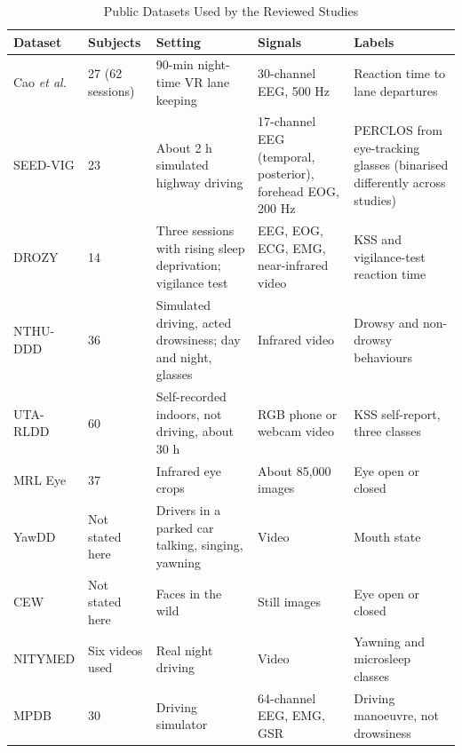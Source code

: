 \begin{table}[!t]
\centering
\caption{Public Datasets Used by the Reviewed Studies}
\label{tab:datasets}
\scriptsize
\setlength{\tabcolsep}{3pt}
\begin{tabularx}{\textwidth}{@{}L{2.5cm}L{1.6cm}L{4cm}L{3.1cm}Y@{}}
\toprule
\textbf{Dataset} & \textbf{Subjects} & \textbf{Setting} & \textbf{Signals} & \textbf{Labels} \\
\midrule
Cao \textit{et al.} \cite{cao2019multichannel} & 27 (62 sessions) & 90-min night-time VR lane keeping & 30-channel EEG, 500 Hz & Reaction time to lane departures \\
SEED-VIG \cite{zheng2017multimodal} & 23 & About 2 h simulated highway driving & 17-channel EEG (temporal, posterior), forehead EOG, 200 Hz & PERCLOS from eye-tracking glasses (binarised differently across studies) \\
DROZY \cite{massoz2016drozy} & 14 & Three sessions with rising sleep deprivation; vigilance test & EEG, EOG, ECG, EMG, near-infrared video & KSS and vigilance-test reaction time \\
NTHU-DDD \cite{weng2017nthu} & 36 & Simulated driving, acted drowsiness; day and night, glasses & Infrared video & Drowsy and non-drowsy behaviours \\
UTA-RLDD \cite{ghoddoosian2019realistic} & 60 & Self-recorded indoors, not driving, about 30 h & RGB phone or webcam video & KSS self-report, three classes \\
MRL Eye \cite{fusek2018mrl} & 37 & Infrared eye crops & About 85{,}000 images & Eye open or closed \\
YawDD \cite{abtahi2014yawdd} & Not stated here & Drivers in a parked car talking, singing, yawning & Video & Mouth state \\
CEW \cite{song2014cew} & Not stated here & Faces in the wild & Still images & Eye open or closed \\
NITYMED \cite{florez2023cnn} & Six videos used & Real night driving & Video & Yawning and microsleep classes \\
MPDB \cite{tao2024mpdb} & 30 & Driving simulator & 64-channel EEG, EMG, GSR & Driving manoeuvre, not drowsiness \\
\bottomrule
\end{tabularx}
\end{table}
